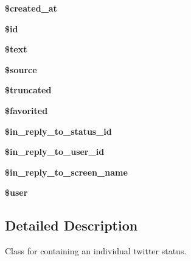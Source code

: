 \begin{CompactItemize}
\item 
\hypertarget{classTwitterStatus_7217082dad0b2d4799241c1afe14f939}{
\textbf{\$created\_\-at}}
\label{classTwitterStatus_7217082dad0b2d4799241c1afe14f939}

\item 
\hypertarget{classTwitterStatus_d91fa666240bc2e3f8fe3c0c7ed8a025}{
\textbf{\$id}}
\label{classTwitterStatus_d91fa666240bc2e3f8fe3c0c7ed8a025}

\item 
\hypertarget{classTwitterStatus_91c0368efb893e8f209f3d1a7d9d3798}{
\textbf{\$text}}
\label{classTwitterStatus_91c0368efb893e8f209f3d1a7d9d3798}

\item 
\hypertarget{classTwitterStatus_8c2f00cb370734c8d49d53acbf9d9d52}{
\textbf{\$source}}
\label{classTwitterStatus_8c2f00cb370734c8d49d53acbf9d9d52}

\item 
\hypertarget{classTwitterStatus_1037e430173d2ae3ddc3a64b09743387}{
\textbf{\$truncated}}
\label{classTwitterStatus_1037e430173d2ae3ddc3a64b09743387}

\item 
\hypertarget{classTwitterStatus_ad75bd195a82dda6539821aa78eda81a}{
\textbf{\$favorited}}
\label{classTwitterStatus_ad75bd195a82dda6539821aa78eda81a}

\item 
\hypertarget{classTwitterStatus_752c7d664db15a4a85a0ecab1b295123}{
\textbf{\$in\_\-reply\_\-to\_\-status\_\-id}}
\label{classTwitterStatus_752c7d664db15a4a85a0ecab1b295123}

\item 
\hypertarget{classTwitterStatus_07e3c4f25db14f55a57033d18dbce080}{
\textbf{\$in\_\-reply\_\-to\_\-user\_\-id}}
\label{classTwitterStatus_07e3c4f25db14f55a57033d18dbce080}

\item 
\hypertarget{classTwitterStatus_81a35ba011ba0244dc3b1d9bc4869345}{
\textbf{\$in\_\-reply\_\-to\_\-screen\_\-name}}
\label{classTwitterStatus_81a35ba011ba0244dc3b1d9bc4869345}

\item 
\hypertarget{classTwitterStatus_af6abbe9167b100a914693409cccd802}{
\textbf{\$user}}
\label{classTwitterStatus_af6abbe9167b100a914693409cccd802}

\end{CompactItemize}


\subsection{Detailed Description}
Class for containing an individual twitter status. 

